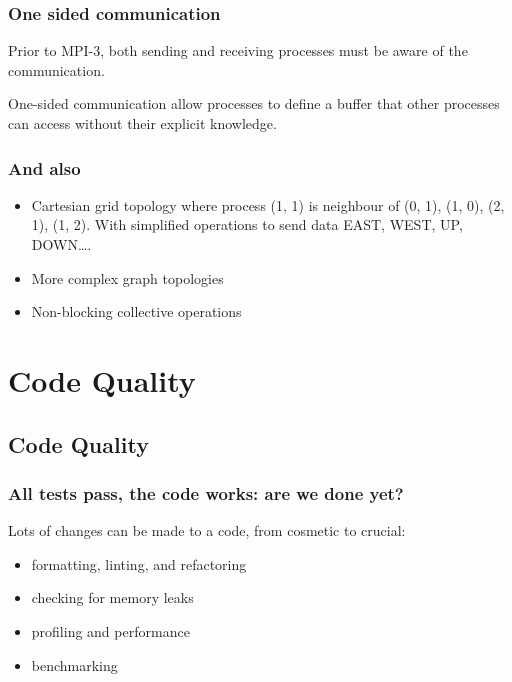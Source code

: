 \subsubsection{One sided communication}\label{one-sided-communication}

Prior to MPI-3, both sending and receiving processes must be aware of
the communication.

One-sided communication allow processes to define a buffer that other
processes can access without their explicit knowledge.

\subsubsection{And also}\label{and-also}

\begin{itemize}
\itemsep1pt\parskip0pt
\item
  Cartesian grid topology where process (1, 1) is neighbour of (0, 1),
  (1, 0), (2, 1), (1, 2). With simplified operations to send data EAST,
  WEST, UP, DOWN\ldots{}.
\item
  More complex graph topologies
\item
  Non-blocking collective operations
\end{itemize}

\section{Code Quality}\label{code-quality}

\subsection{Code Quality}\label{code-quality-1}

\subsubsection{All tests pass, the code works: are we done
yet?}\label{all-tests-pass-the-code-works-are-we-done-yet}

Lots of changes can be made to a code, from cosmetic to crucial:

\begin{itemize}
\itemsep1pt\parskip0pt
\item
  formatting, linting, and refactoring
\item
  checking for memory leaks
\item
  profiling and performance
\item
  benchmarking
\end{itemize}


